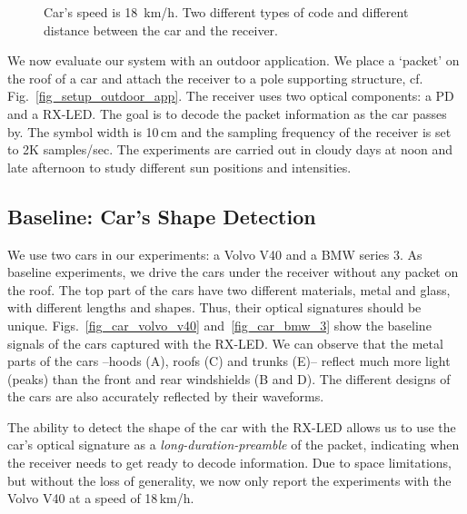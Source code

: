 \documentclass[10pt]{sig-alternate-05-2015}
\begin{document}
{\begin{figure*}[t]
	\hfill
	\hfill
	\vspace{-2mm}
	\caption {Car's speed is 18~km/h. Two different types of code and different distance between the car and the receiver.}
	\vspace{-2mm}
	\label{fig_speed100cmLEDID1}
\end{figure*}

We now evaluate our system with an outdoor application. We place a `packet' on the roof of a car and attach the receiver to a pole supporting structure, cf. Fig.~\ref{fig_setup_outdoor_app}. The receiver uses two optical components: a PD and a RX-LED. The goal is to decode the packet information as the car passes by. The symbol width is 10\,cm and the sampling frequency of the receiver is set to 2K samples/sec. The experiments are carried out in cloudy days at noon and late afternoon {to study different sun positions and intensities}.

\subsection{Baseline: Car's Shape Detection}

We use two cars in our experiments: a Volvo V40 and a BMW series 3. As baseline experiments, we drive the cars under the receiver without any packet on the roof. The top part of the cars have two different materials, metal and glass, with different lengths and shapes. Thus, their optical signatures should be unique. Figs.~\ref{fig_car_volvo_v40} and~\ref{fig_car_bmw_3} show the baseline signals of the cars captured with the RX-LED. We can observe that the metal parts of the cars --hoods (A), roofs (C) and trunks (E)-- reflect much more light (peaks) than the front and rear windshields (B and D). The different designs of the cars are also accurately reflected by their waveforms.

The ability to detect the shape of the car with the RX-LED allows us to use the car's optical signature as a {\it long-duration-preamble} of the packet, indicating when the receiver needs to get ready to decode information. 
Due to space limitations, {but without the loss of generality}, we now only report the experiments with the Volvo V40 at a  speed of 18\,km/h. 



}
\end{document}
